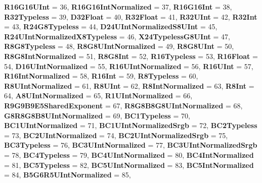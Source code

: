 \begin{DoxyCompactItemize}
{\bfseries R16\+G16\+U\+Int} = 36, 
{\bfseries R16\+G16\+Int\+Normalized} = 37, 
\newline
{\bfseries R16\+G16\+Int} = 38, 
{\bfseries R32\+Typeless} = 39, 
{\bfseries D32\+Float} = 40, 
{\bfseries R32\+Float} = 41, 
\newline
{\bfseries R32\+U\+Int} = 42, 
{\bfseries R32\+Int} = 43, 
{\bfseries R24\+G8\+Typeless} = 44, 
{\bfseries D24\+U\+Int\+Normalized\+S8\+U\+Int} = 45, 
\newline
{\bfseries R24\+U\+Int\+Normalized\+X8\+Typeless} = 46, 
{\bfseries X24\+Typeless\+G8\+U\+Int} = 47, 
{\bfseries R8\+G8\+Typeless} = 48, 
{\bfseries R8\+G8\+U\+Int\+Normalized} = 49, 
\newline
{\bfseries R8\+G8\+U\+Int} = 50, 
{\bfseries R8\+G8\+Int\+Normalized} = 51, 
{\bfseries R8\+G8\+Int} = 52, 
{\bfseries R16\+Typeless} = 53, 
\newline
{\bfseries R16\+Float} = 54, 
{\bfseries D16\+U\+Int\+Normalized} = 55, 
{\bfseries R16\+U\+Int\+Normalized} = 56, 
{\bfseries R16\+U\+Int} = 57, 
\newline
{\bfseries R16\+Int\+Normalized} = 58, 
{\bfseries R16\+Int} = 59, 
{\bfseries R8\+Typeless} = 60, 
{\bfseries R8\+U\+Int\+Normalized} = 61, 
\newline
{\bfseries R8\+U\+Int} = 62, 
{\bfseries R8\+Int\+Normalized} = 63, 
{\bfseries R8\+Int} = 64, 
{\bfseries A8\+U\+Int\+Normalized} = 65, 
\newline
{\bfseries R1\+U\+Int\+Normalized} = 66, 
{\bfseries R9\+G9\+B9\+E5\+Shared\+Exponent} = 67, 
{\bfseries R8\+G8\+B8\+G8\+U\+Int\+Normalized} = 68, 
{\bfseries G8\+R8\+G8\+B8\+U\+Int\+Normalized} = 69, 
\newline
{\bfseries B\+C1\+Typeless} = 70, 
{\bfseries B\+C1\+U\+Int\+Normalized} = 71, 
{\bfseries B\+C1\+U\+Int\+Normalized\+Srgb} = 72, 
{\bfseries B\+C2\+Typeless} = 73, 
\newline
{\bfseries B\+C2\+U\+Int\+Normalized} = 74, 
{\bfseries B\+C2\+U\+Int\+Normalized\+Srgb} = 75, 
{\bfseries B\+C3\+Typeless} = 76, 
{\bfseries B\+C3\+U\+Int\+Normalized} = 77, 
\newline
{\bfseries B\+C3\+U\+Int\+Normalized\+Srgb} = 78, 
{\bfseries B\+C4\+Typeless} = 79, 
{\bfseries B\+C4\+U\+Int\+Normalized} = 80, 
{\bfseries B\+C4\+Int\+Normalized} = 81, 
\newline
{\bfseries B\+C5\+Typeless} = 82, 
{\bfseries B\+C5\+U\+Int\+Normalized} = 83, 
{\bfseries B\+C5\+Int\+Normalized} = 84, 
{\bfseries B5\+G6\+R5\+U\+Int\+Normalized} = 85, 
\newline

\end{DoxyCompactItemize}

